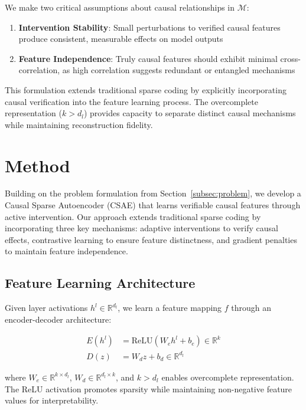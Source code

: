 \documentclass{article} %
\begin{document}
We make two critical assumptions about causal relationships in $\mathcal{M}$:

\begin{enumerate}
    \item \textbf{Intervention Stability}: Small perturbations to verified causal features produce consistent, measurable effects on model outputs
    \item \textbf{Feature Independence}: Truly causal features should exhibit minimal cross-correlation, as high correlation suggests redundant or entangled mechanisms
\end{enumerate}

This formulation extends traditional sparse coding by explicitly incorporating causal verification into the feature learning process. The overcomplete representation ($k > d_l$) provides capacity to separate distinct causal mechanisms while maintaining reconstruction fidelity.

\section{Method}
\label{sec:method}

Building on the problem formulation from Section~\ref{subsec:problem}, we develop a Causal Sparse Autoencoder (CSAE) that learns verifiable causal features through active intervention. Our approach extends traditional sparse coding by incorporating three key mechanisms: adaptive interventions to verify causal effects, contrastive learning to ensure feature distinctness, and gradient penalties to maintain feature independence.

\subsection{Feature Learning Architecture}
Given layer activations $h^l \in \mathbb{R}^{d_l}$, we learn a feature mapping $f$ through an encoder-decoder architecture:

\begin{align*}
    E(h^l) &= \text{ReLU}(W_e h^l + b_e) \in \mathbb{R}^k \\
    D(z) &= W_d z + b_d \in \mathbb{R}^{d_l}
\end{align*}

where $W_e \in \mathbb{R}^{k \times d_l}$, $W_d \in \mathbb{R}^{d_l \times k}$, and $k > d_l$ enables overcomplete representation. The ReLU activation promotes sparsity while maintaining non-negative feature values for interpretability.
\end{document}
